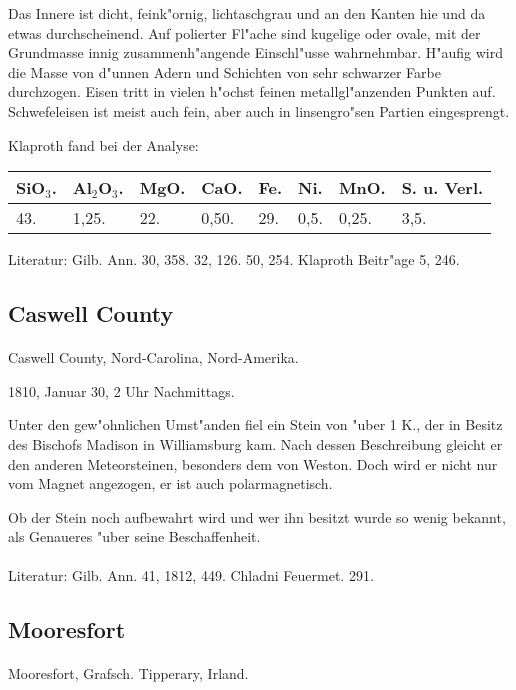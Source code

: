 \documentclass[a4paper, 11pt, oneside]{article}
\begin{document}
Das Innere ist dicht, feink"ornig, lichtaschgrau und an den Kanten hie und da etwas durchscheinend. Auf polierter Fl"ache sind kugelige oder ovale, mit der Grundmasse innig zusammenh"angende Einschl"usse wahrnehmbar. H"aufig wird die Masse von d"unnen Adern und Schichten von sehr schwarzer Farbe durchzogen. Eisen tritt in vielen h"ochst feinen metallgl"anzenden Punkten auf. Schwefeleisen ist meist auch fein, aber auch in linsengro"sen Partien eingesprengt.

Klaproth fand bei der Analyse:
\begin{table}[!ht]
    \centering
    \begin{tabular}{l l l l l l l l}
        SiO$_{3}$. & Al$_{2}$O$_{3}$. & MgO. & CaO. & Fe. & Ni. & MnO. & S. u. Verl. \\ \hline
        43. & 1,25. & 22. & 0,50. & 29. & 0,5. & 0,25. & 3,5. \\
    \end{tabular}
\end{table}

\footnotesize
Literatur: Gilb. Ann. 30, 358. 32, 126. 50, 254. Klaproth Beitr"age 5, 246.
\subsection{Caswell County}
\normalsize
\paragraph{}
Caswell County, Nord-Carolina, Nord-Amerika.

1810, Januar 30, 2 Uhr Nachmittags.

Unter den gew"ohnlichen Umst"anden fiel ein Stein von "uber 1 K., der in Besitz des Bischofs Madison in Williamsburg kam. Nach dessen Beschreibung gleicht er den anderen Meteorsteinen, besonders dem von Weston. Doch wird er nicht nur vom Magnet angezogen, er ist auch polarmagnetisch.

Ob der Stein noch aufbewahrt wird und wer ihn besitzt wurde so wenig bekannt, als Genaueres "uber seine Beschaffenheit.
\footnotesize
\paragraph{}
Literatur: Gilb. Ann. 41, 1812, 449. Chladni Feuermet. 291.
\subsection{Mooresfort}
\normalsize
\paragraph{}
Mooresfort, Grafsch. Tipperary, Irland.
\end{document}
